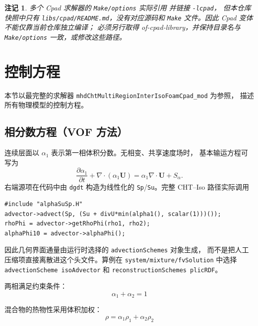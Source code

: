 \documentclass[11pt,a4paper]{article}
\newtheorem{remark}{注记}[section]
\begin{document}
\begin{remark}
多个 Cpad 求解器的 \texttt{Make/options} 实际引用
 并链接 \texttt{-lcpad}，
但本仓库快照中只有 \texttt{libs/cpad/README.md}，没有对应源码和
\texttt{Make} 文件。因此 Cpad 变体不能仅靠当前仓库独立编译；
必须另行取得 of-cpad-library，并保持目录名与 \texttt{Make/options}
一致，或修改这些路径。
\end{remark}

\section{控制方程}

本节以最完整的求解器 \texttt{mhdChtMultiRegionInterIsoFoamCpad\_mod} 为参照，
描述所有物理模型的控制方程。

\subsection{相分数方程（VOF 方法）}

连续层面以 $\alpha_1$ 表示第一相体积分数。无相变、共享速度场时，
基本输运方程可写为
\begin{equation}
\frac{\partial \alpha_1}{\partial t}
+\nabla\cdot(\alpha_1\mathbf{U})
=\alpha_1\nabla\cdot\mathbf{U}+S_\alpha .
\label{eq:alphaEqn}
\end{equation}
右端源项在代码中由 \texttt{dgdt} 构造为线性化的
\texttt{Sp}/\texttt{Su}。完整 CHT--Iso 路径实际调用
\begin{lstlisting}[style=cppstyle]
#include "alphaSuSp.H"
advector->advect(Sp, (Su + divU*min(alpha1(), scalar(1)))());
rhoPhi = advector->getRhoPhi(rho1, rho2);
alphaPhi10 = advector->alphaPhi();
\end{lstlisting}
因此几何界面通量由运行时选择的 \texttt{advectionSchemes} 对象生成，
而不是把人工压缩项直接离散进这个头文件。算例在
\texttt{system/mixture/fvSolution} 中选择
\texttt{advectionScheme isoAdvector} 和
\texttt{reconstructionSchemes plicRDF}。

两相满足约束条件：
\begin{equation}
\alpha_1 + \alpha_2 = 1
\end{equation}

混合物的热物性采用体积加权：
\begin{equation}
\rho = \alpha_1 \rho_1 + \alpha_2 \rho_2
\end{equation}
\end{document}
